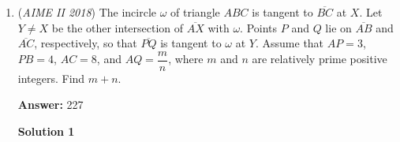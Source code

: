 \begin{enumerate}
 $P_n = (\frac{1}{6})^3 \cdot (1-\sum\limits_{k=1}\limits^{n-3} P_k)$

 Substitute the values for

 $\begin{cases} P_{2n+1} = \frac{1}{216} (1-\sum\limits_{k=1}\limits^{2n-2} P_k) \\ P_{2n} = \frac{1}{216} (1-\sum\limits_{k=1}\limits^{2n-3} P_k) \end{cases}$
$P_{2n+1}-P_{2n} = \frac{1}{216}(-P_{2n-2})$
$\sum\limits_{n=2}\limits^{\infty} P_{2n+1} - \sum\limits_{n=2}\limits^{\infty} P_{2n} = -\frac{1}{216}(\sum\limits_{n=2}\limits^{\infty} P_{2n-2})$
$(P_o - P_3) - P_e = -\frac{1}{216} \cdot P_e$

 It is easy to see that $P_3 = -(\frac{1}{6})^3 = \frac{1}{216}$ with only one case of $1,2,3$. Also, $P_{o}$ and $P_{e}$ should be complementary values. Therefore we get two equations for two unknown variables:

 
 \[\begin{cases} P_o - \frac{1}{216} = \frac{215}{216} P_e \\ P_o + P_e = 1 \end{cases}\]

 
So $\frac{431}{216} \cdot P_e = \frac{215}{216}$, and $P_e = \frac{215}{431}$
$P_o = 1-\frac{215}{431} = \frac{216}{431}$
$216+431=\boxed{647}$

 -cassphe

 


	\item (\textit{AIME II 2018}) The incircle $\omega$ of triangle $ABC$ is tangent to $\overline{BC}$ at $X$. Let $Y \neq X$ be the other intersection of $\overline{AX}$ with $\omega$. Points $P$ and $Q$ lie on $\overline{AB}$ and $\overline{AC}$, respectively, so that $\overline{PQ}$ is tangent to $\omega$ at $Y$. Assume that $AP = 3$, $PB = 4$, $AC = 8$, and $AQ = \dfrac{m}{n}$, where $m$ and $n$ are relatively prime positive integers. Find $m+n$.


 
 \textbf{Answer: }227



\textbf{Solution 1}


\end{enumerate}
